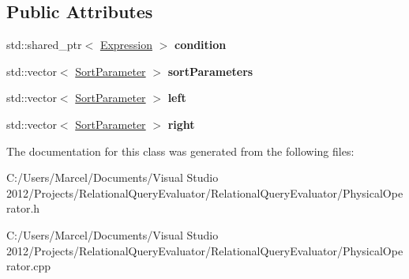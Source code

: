 \subsection*{Public Attributes}
\begin{DoxyCompactItemize}
\item 
\hypertarget{class_merge_non_equi_join_ad1307cbe8f5e88f685ece833fcea67c2}{std\+::shared\+\_\+ptr$<$ \hyperlink{class_expression}{Expression} $>$ {\bfseries condition}}\label{class_merge_non_equi_join_ad1307cbe8f5e88f685ece833fcea67c2}

\item 
\hypertarget{class_merge_non_equi_join_a5f8b68c20d65ec2e07f41f2c2c4079d6}{std\+::vector$<$ \hyperlink{class_sort_parameter}{Sort\+Parameter} $>$ {\bfseries sort\+Parameters}}\label{class_merge_non_equi_join_a5f8b68c20d65ec2e07f41f2c2c4079d6}

\item 
\hypertarget{class_merge_non_equi_join_a785b0aeaa5ec15536c03272a21f8ebe0}{std\+::vector$<$ \hyperlink{class_sort_parameter}{Sort\+Parameter} $>$ {\bfseries left}}\label{class_merge_non_equi_join_a785b0aeaa5ec15536c03272a21f8ebe0}

\item 
\hypertarget{class_merge_non_equi_join_ae3631adf9752e5ab861dbf986b92ff00}{std\+::vector$<$ \hyperlink{class_sort_parameter}{Sort\+Parameter} $>$ {\bfseries right}}\label{class_merge_non_equi_join_ae3631adf9752e5ab861dbf986b92ff00}

\end{DoxyCompactItemize}


The documentation for this class was generated from the following files\+:\begin{DoxyCompactItemize}
\item 
C\+:/\+Users/\+Marcel/\+Documents/\+Visual Studio 2012/\+Projects/\+Relational\+Query\+Evaluator/\+Relational\+Query\+Evaluator/Physical\+Operator.\+h\item 
C\+:/\+Users/\+Marcel/\+Documents/\+Visual Studio 2012/\+Projects/\+Relational\+Query\+Evaluator/\+Relational\+Query\+Evaluator/Physical\+Operator.\+cpp\end{DoxyCompactItemize}
